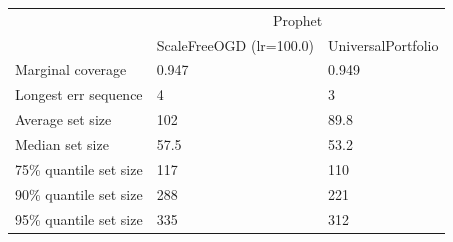 \begin{tabular}{lll}
\toprule
& \multicolumn{2}{c}{Prophet} \\
& ScaleFreeOGD (lr=100.0) & UniversalPortfolio \\
\midrule
Marginal coverage & 0.947 & 0.949 \\
Longest err sequence & 4 & 3 \\
Average set size & 102 & 89.8 \\
Median set size & 57.5 & 53.2 \\
75\% quantile set size & 117 & 110 \\
90\% quantile set size & 288 & 221 \\
95\% quantile set size & 335 & 312 \\
\bottomrule
\end{tabular}
